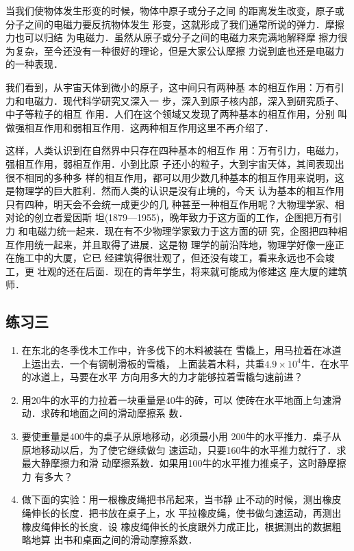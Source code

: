     当我们使物体发生形变的时候，物体中原子或分子之间
的距离发生改变，原子或分子之间的电磁力要反抗物体发生
形变，这就形成了我们通常所说的弹力．摩擦力也可以归结
为电磁力．虽然从原子或分子之间的电磁力来完满地解释摩
擦力很为复杂，至今还没有一种很好的理论，但是大家公认摩擦
力说到底也还是电磁力的一种表现．

    我们看到，从宇宙天体到微小的原子，这中间只有两种基
本的相互作用：万有引力和电磁力．现代科学研究又深入一
步，深入到原子核内部，深入到研究质子、中子等粒子的相互
作用．人们在这个领域又发现了两种基本的相互作用，分别
叫做强相互作用和弱相互作用．这两种相互作用这里不再介绍了．

    这样，人类认识到在自然界中只存在四种基本的相互作
用：万有引力，电磁力，强相互作用，弱相互作用．小到比原
子还小的粒子，大到宇宙天体，其间表现出很不相同的多种多
样的相互作用，都可以用少数几种基本的相互作用来说明，这
是物理学的巨大胜利．然而人类的认识是没有止境的，今天
认为基本的相互作用只有四种，明天会不会统一成更少的几
种甚至一种相互作用呢？大物理学家、相对论的创立者爱因斯
坦(1879—1955)，晚年致力于这方面的工作，企图把万有引力
和电磁力统一起来．现在有不少物理学家致力于这方面的研
究，企图把四种相互作用统一起来，并且取得了进展．这是物
理学的前沿阵地，物理学好像一座正在施工中的大厦，它已
经建筑得很壮观了，但还没有竣工，看来永远也不会竣工，更
壮观的还在后面．现在的青年学生，将来就可能成为修建这
座大厦的建筑师．

\subsection*{练习三} 
\begin{enumerate} 
\item  在东北的冬季伐木工作中，许多伐下的木料被装在
雪橇上，用马拉着在冰道上运出去．一个有钢制滑板的雪橇，
上面装着木料，共重$4.9\times 10^4$牛．在水平的冰道上，马要在水平
方向用多大的力才能够拉着雪橇匀速前进？

\item  用20牛的水平的力拉着一块重量是40牛的砖，可以
使砖在水平地面上匀速滑动．求砖和地面之间的滑动摩擦系
数．
\item  要使重量是400牛的桌子从原地移动，必须最小用
200牛的水平推力．桌子从原地移动以后，为了使它继续做匀
速运动，只要160牛的水平推力就行了．求最大静摩擦力和滑
动摩擦系数．如果用100牛的水平推力推桌子，这时静摩擦力
有多大？

\item  做下面的实验：用一根橡皮绳把书吊起来，当书静
止不动的时候，测出橡皮绳伸长的长度．把书放在桌子上，水
平拉橡皮绳，使书做匀速运动，再测出橡皮绳伸长的长度．设
橡皮绳伸长的长度跟外力成正比，根据测出的数据粗略地算
出书和桌面之间的滑动摩擦系数．
\end{enumerate} 


